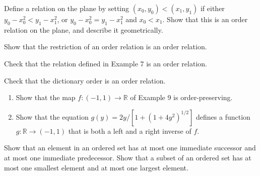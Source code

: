   \begin{exercise}[Munkres 3.6]
    Define a relation on the plane by setting $(x_0, y_0) < (x_1, y_1)$ if either $y_0 - x_0^2 < y_1 - x_1^2$, or $y_0 - x_0^2 = y_1 - x_1^2$ and $x_0 < x_1$. Show that this is an order relation on the plane, and describe it geometrically.
  \end{exercise}
  \begin{solution}
    
  \end{solution}

  \begin{exercise}[Munkres 3.7]
    Show that the restriction of an order relation is an order relation.
  \end{exercise}
  \begin{solution}
    
  \end{solution}

  \begin{exercise}[Munkres 3.8]
    Check that the relation defined in Example 7 is an order relation.
  \end{exercise}
  \begin{solution}
    
  \end{solution}

  \begin{exercise}[Munkres 3.9]
    Check that the dictionary order is an order relation.
  \end{exercise}
  \begin{solution}
    
  \end{solution}

  \begin{exercise}[Munkres 3.10]
    \begin{enumerate}
      \item Show that the map $f: (-1, 1) \to \mathbb{R}$ of Example 9 is order-preserving.
      \item Show that the equation $g(y) = 2y/[1 + (1 + 4y^2)^{1/2}]$ defines a function $g: \mathbb{R} \to (-1, 1)$ that is both a left and a right inverse of $f$.
    \end{enumerate}
  \end{exercise}
  \begin{solution}
    
  \end{solution}

  \begin{exercise}[Munkres 3.11]
    Show that an element in an ordered set has at most one immediate successor and at most one immediate predecessor. Show that a subset of an ordered set has at most one smallest element and at most one largest element.
  \end{exercise}
  \begin{solution}
    
  \end{solution}


